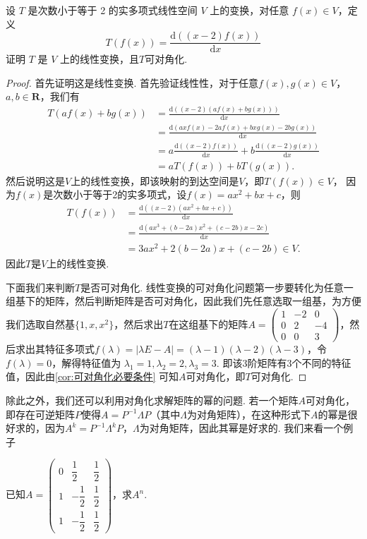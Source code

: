 \begin{example}{}{}
    设 $T$ 是次数小于等于 2 的实多项式线性空间 $V$ 上的变换，对任意 $f(x) \in V$，定义
    \[T(f(x))=\frac{\mathrm{d}((x-2)f(x))}{\mathrm{d}x}\]
    证明 $T$ 是 $V$ 上的线性变换，且$T$可对角化.
\end{example}

\begin{proof}
    首先证明这是线性变换. 首先验证线性性，对于任意$f(x),g(x)\in V$，$a,b\in\mathbf{R}$，我们有
    \begin{align*}
        T(af(x)+bg(x)) & =\frac{\mathrm{d}((x-2)(af(x)+bg(x)))}{\mathrm{d}x}                                    \\
                       & =\frac{\mathrm{d}(axf(x)-2af(x)+bxg(x)-2bg(x))}{\mathrm{d}x}                           \\
                       & =a\frac{\mathrm{d}((x-2)f(x))}{\mathrm{d}x}+b\frac{\mathrm{d}((x-2)g(x))}{\mathrm{d}x} \\
                       & =aT(f(x))+bT(g(x)).
    \end{align*}
    然后说明这是$V$上的线性变换，即该映射的到达空间是$V$，即$T(f(x))\in V$， 因为$f(x)$是次数小于等于2的实多项式，设$f(x)=ax^2+bx+c$，则
    \begin{align*}
        T(f(x)) & =\frac{\mathrm{d}((x-2)(ax^2+bx+c))}{\mathrm{d}x}          \\
                & =\frac{\mathrm{d}(ax^3+(b-2a)x^2+(c-2b)x-2c)}{\mathrm{d}x} \\
                & =3ax^2+2(b-2a)x+(c-2b)\in V.
    \end{align*}
    因此$T$是$V$上的线性变换.

    下面我们来判断$T$是否可对角化. 线性变换的可对角化问题第一步要转化为任意一组基下的矩阵，然后判断矩阵是否可对角化，因此我们先任意选取一组基，为方便我们选取自然基$\{1,x,x^2\}$，然后求出$T$在这组基下的矩阵$A=\begin{pmatrix}
            1 & -2 & 0 \\ 0 & 2 & -4 \\ 0 & 0 & 3
        \end{pmatrix}$，然后求出其特征多项式$f(\lambda)=|\lambda E-A|=(\lambda-1)(\lambda-2)(\lambda-3)$，令$f(\lambda)=0$，解得特征值为 $\lambda_1=1,\lambda_2=2,\lambda_3=3$. 即该3阶矩阵有3个不同的特征值，因此由\autoref{cor:可对角化必要条件} 可知$A$可对角化，即$T$可对角化.
\end{proof}

除此之外，我们还可以利用对角化求解矩阵的幂的问题. 若一个矩阵$A$可对角化，即存在可逆矩阵$P$使得$A=P^{-1}\varLambda P$（其中$\varLambda$为对角矩阵），在这种形式下$A$的幂是很好求的，因为$A^k=P^{-1}\varLambda^kP$，$\varLambda$为对角矩阵，因此其幂是好求的. 我们来看一个例子
\begin{example}{}{}
    已知$A=\begin{pmatrix}
            0 & \dfrac{1}{2}  & \dfrac{1}{2} \\[2ex]
            1 & -\dfrac{1}{2} & \dfrac{1}{2} \\[2ex]
            1 & -\dfrac{1}{2} & \dfrac{1}{2}
        \end{pmatrix}$，求$A^n$.
\end{example}

